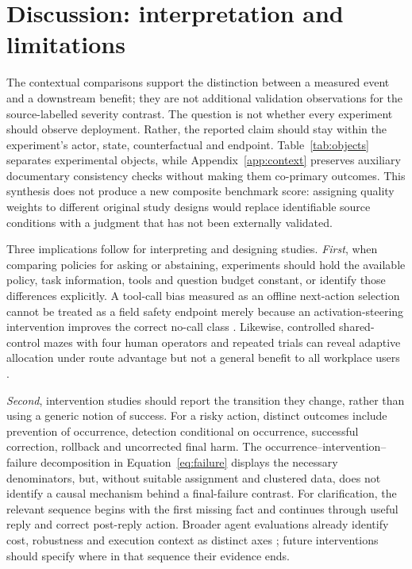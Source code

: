 \section{Discussion: interpretation and limitations}\label{sec:synthesis}
The contextual comparisons support the distinction between a measured event and a downstream benefit; they are not additional validation observations for the source-labelled severity contrast. The question is not whether every experiment should observe deployment. Rather, the reported claim should stay within the experiment's actor, state, counterfactual and endpoint. Table~\ref{tab:objects} separates experimental objects, while Appendix~\ref{app:context} preserves auxiliary documentary consistency checks without making them co-primary outcomes. This synthesis does not produce a new composite benchmark score: assigning quality weights to different original study designs would replace identifiable source conditions with a judgment that has not been externally validated.

Three implications follow for interpreting and designing studies. \emph{First}, when comparing policies for asking or abstaining, experiments should hold the available policy, task information, tools and question budget constant, or identify those differences explicitly. A tool-call bias measured as an offline next-action selection cannot be treated as a field safety endpoint merely because an activation-steering intervention improves the correct no-call class \cite{ref42}. Likewise, controlled shared-control mazes with four human operators and repeated trials can reveal adaptive allocation under route advantage but not a general benefit to all workplace users \cite{ref43}.

\emph{Second}, intervention studies should report the transition they change, rather than using a generic notion of success. For a risky action, distinct outcomes include prevention of occurrence, detection conditional on occurrence, successful correction, rollback and uncorrected final harm. The occurrence--intervention--failure decomposition in Equation~\ref{eq:failure} displays the necessary denominators, but, without suitable assignment and clustered data, does not identify a causal mechanism behind a final-failure contrast. For clarification, the relevant sequence begins with the first missing fact and continues through useful reply and correct post-reply action. Broader agent evaluations already identify cost, robustness and execution context as distinct axes \cite{ref2,ref7,ref34}; future interventions should specify where in that sequence their evidence ends.

